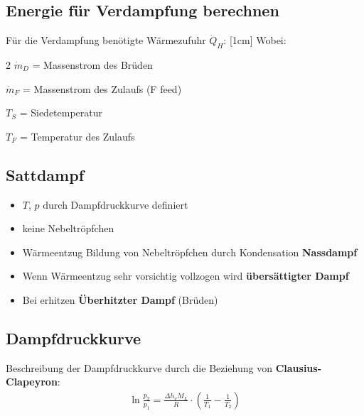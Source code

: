 \documentclass[a4paper,10pt,twoside]{article}
\begin{document}
\subsection{Energie für Verdampfung berechnen}

Für die Verdampfung benötigte Wärmezufuhr $\dot{Q}_H$:
\pp
{}
\reversemarginpar
{}[1cm]
\pp
Wobei: \par
\begin{multicols}{2}
$\dot{m}_D$ = Massenstrom des Brüden \par
$\dot{m}_F$ = Massenstrom des Zulaufs (F \RA feed) \par 
$T_S$ = Siedetemperatur \par 
$T_F$ = Temperatur des Zulaufs \par
\end{multicols}

\subsection{Sattdampf}
\begin{itemize}
\item $T$, $p$ durch Dampfdruckkurve definiert
\item keine Nebeltröpfchen
\item Wärmeentzug \RA Bildung von Nebeltröpfchen durch Kondensation \RA \textbf{Nassdampf}
\item Wenn Wärmeentzug sehr vorsichtig vollzogen wird \RA \textbf{übersättigter Dampf}
\item Bei erhitzen \RA \textbf{Überhitzter Dampf} (Brüden)
\end{itemize}

\pagebreak
\subsection{Dampfdruckkurve}
Beschreibung der Dampfdruckkurve durch die Beziehung von \textbf{Clausius-Clapeyron}:
\begin{align*}
\ln \frac{p_2}{p_1} = \frac{\Delta h_v M_L}{R} \cdot ( \frac{1}{T_1} - \frac{1}{T_2} )
\end{align*}
\end{document}
